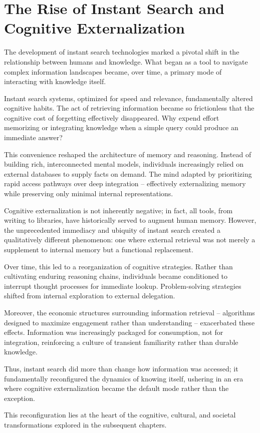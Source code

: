 \section{The Rise of Instant Search and Cognitive Externalization}

The development of instant search technologies marked a pivotal shift in
the relationship between humans and knowledge. What began as a tool to
navigate complex information landscapes became, over time, a primary
mode of interacting with knowledge itself.

Instant search systems, optimized for speed and relevance, fundamentally
altered cognitive habits. The act of retrieving information became so
frictionless that the cognitive cost of forgetting effectively
disappeared. Why expend effort memorizing or integrating knowledge when
a simple query could produce an immediate answer?

This convenience reshaped the architecture of memory and reasoning.
Instead of building rich, interconnected mental models, individuals
increasingly relied on external databases to supply facts on demand. The
mind adapted by prioritizing rapid access pathways over deep integration
-- effectively externalizing memory while preserving only minimal
internal representations.

Cognitive externalization is not inherently negative; in fact, all
tools, from writing to libraries, have historically served to augment
human memory. However, the unprecedented immediacy and ubiquity of
instant search created a qualitatively different phenomenon: one where
external retrieval was not merely a supplement to internal memory but a
functional replacement.

Over time, this led to a reorganization of cognitive strategies. Rather
than cultivating enduring reasoning chains, individuals became
conditioned to interrupt thought processes for immediate lookup.
Problem-solving strategies shifted from internal exploration to external
delegation.

Moreover, the economic structures surrounding information retrieval --
algorithms designed to maximize engagement rather than understanding --
exacerbated these effects. Information was increasingly packaged for
consumption, not for integration, reinforcing a culture of transient
familiarity rather than durable knowledge.

Thus, instant search did more than change how information was accessed;
it fundamentally reconfigured the dynamics of knowing itself, ushering
in an era where cognitive externalization became the default mode rather
than the exception.

This reconfiguration lies at the heart of the cognitive, cultural, and
societal transformations explored in the subsequent chapters.

